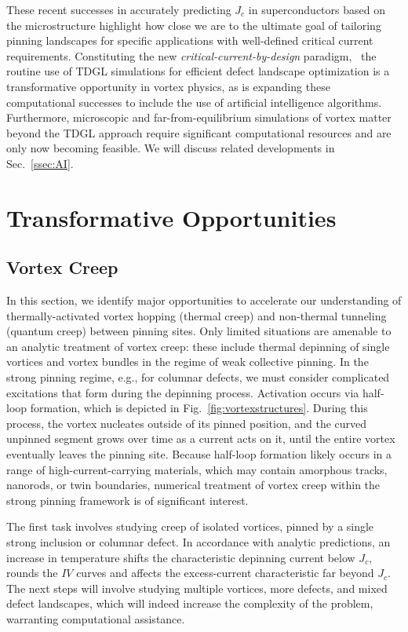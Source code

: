\documentclass[%
 aip,
 amsmath,amssymb,
 reprint,%
floatfix]{revtex4-1}
\newcommand{\Jc}{J_{c}}
\begin{document}
These recent successes in accurately predicting $\Jc$ in superconductors based on the microstructure highlight how close we are to the ultimate goal of tailoring pinning landscapes for specific applications with well-defined critical current requirements.  Constituting the new \textit{critical-current-by-design} paradigm,~\cite{ROPP,ted100} the routine use of TDGL simulations for efficient defect landscape optimization is a transformative opportunity in vortex physics, as is expanding these computational successes to include the use of artificial intelligence algorithms.  Furthermore, microscopic and far-from-equilibrium simulations of vortex matter beyond the TDGL approach require significant computational resources and are only now becoming feasible. We will discuss related developments in Sec.~\ref{ssec:AI}.


\section{Transformative Opportunities}

\subsection{Vortex Creep\label{ssec:vortexcreep}}

In this section, we identify major opportunities to accelerate our understanding of thermally-activated vortex hopping (thermal creep) and non-thermal tunneling (quantum creep) between pinning sites. Only limited situations are amenable to an analytic treatment of vortex creep: these include thermal depinning of single vortices and vortex bundles in the regime of weak collective pinning.  In the strong pinning regime, e.g., for columnar defects, we must consider complicated excitations that form during the depinning process.  Activation occurs via half-loop formation\cite{PhysRevB.51.6526}, which is depicted in Fig.~\ref{fig:vortexstructures}.  During this process, the vortex nucleates outside of its pinned position, and the curved unpinned segment grows over time as a current acts on it, until the entire vortex eventually leaves the pinning site.  Because half-loop formation likely occurs in a range of high-current-carrying materials, which may contain amorphous tracks, nanorods, or twin boundaries, numerical treatment of vortex creep within the strong pinning framework is of significant interest.




The first task involves studying creep of isolated vortices, pinned by a single strong inclusion or columnar defect. In accordance with analytic predictions, an increase in temperature shifts the characteristic depinning current below $\Jc$, rounds the $IV$ curves and affects the excess-current characteristic far beyond $\Jc$\cite{Buchacek2019a, Buchacek2019b, Buchacek2020-condmat}. The next steps will involve studying multiple vortices, more defects, and mixed defect landscapes, which will indeed increase the complexity of the problem, warranting computational assistance.
\end{document}
